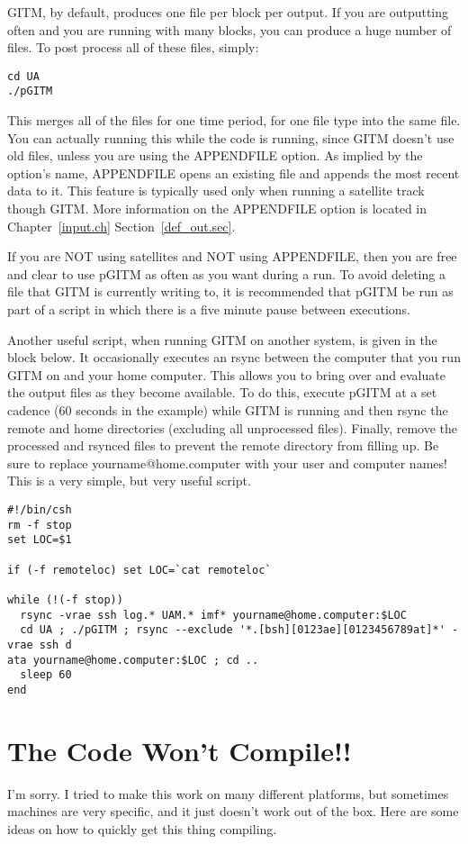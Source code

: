 GITM, by default, produces one file per block per output.  If you are outputting often and you are running with many blocks, you can produce a huge number of files.  To post process all of these files, simply:

\begin{verbatim}
cd UA
./pGITM
\end{verbatim}

This merges all of the files for one time period, for one file type into the same file.  You can actually running this while the code is running, since GITM doesn't use old files, unless you are using the APPENDFILE option.  As implied by the option's name, APPENDFILE opens an existing file and appends the most recent data to it.  This feature is typically used only when running a satellite track though GITM.  More information on the APPENDFILE option is located in Chapter~\ref{input.ch} Section~\ref{def_out.sec}.

If you are NOT using satellites and NOT using APPENDFILE, then you are free and clear to use pGITM as often as you want during a run.  To avoid deleting a file that GITM is currently writing to, it is recommended that pGITM be run as part of a script in which there is a five minute pause between executions.

Another useful script, when running GITM on another system, is given in the block below.  It occasionally executes an rsync between the computer that you run GITM on and your home computer.  This allows you to bring over and evaluate the output files as they become available.  To do this, execute pGITM at a set cadence (60 seconds in the example) while GITM is running and then rsync the remote and home directories (excluding all unprocessed files).  Finally, remove the processed and rsynced files to prevent the remote directory from filling up.  Be sure to replace yourname@home.computer with your user and computer names!  This is a very simple, but very useful script.

\begin{verbatim}
#!/bin/csh
rm -f stop
set LOC=$1

if (-f remoteloc) set LOC=`cat remoteloc`

while (!(-f stop))
  rsync -vrae ssh log.* UAM.* imf* yourname@home.computer:$LOC
  cd UA ; ./pGITM ; rsync --exclude '*.[bsh][0123ae][0123456789at]*' -vrae ssh d
ata yourname@home.computer:$LOC ; cd ..
  sleep 60
end
\end{verbatim}

\section{The Code Won't Compile!!}
I'm sorry. I tried to make this work on many different platforms, but
sometimes machines are very specific, and it just doesn't work out of
the box. Here are some ideas on how to quickly get this thing
compiling.

